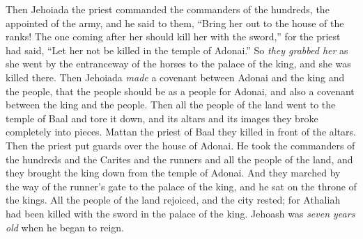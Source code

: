 \begin{biblechapter}
\verse Then Jehoiada the priest commanded the commanders of the hundreds, the appointed of the army, and he said to them, “Bring her out to the house of the ranks! The one coming after her should kill her with the sword,” for the priest had said, “Let her not be killed in the temple of Adonai.”
\verse So \textit{they grabbed her} as she went by the entranceway of the horses to the palace of the king, and she was killed there.
\verse Then Jehoiada \textit{made} a covenant between Adonai and the king and the people, that the people should be as a people for Adonai, and also a covenant between the king and the people.
\verse Then all the people of the land went to the temple of Baal and tore it down, and its altars and its images they broke completely into pieces. Mattan the priest of Baal they killed in front of the altars. Then the priest put guards over the house of Adonai.
\verse He took the commanders of the hundreds and the Carites and the runners and all the people of the land, and they brought the king down from the temple of Adonai. And they marched by the way of the runner’s gate to the palace of the king, and he sat on the throne of the kings.
\verse All the people of the land rejoiced, and the city rested; for Athaliah had been killed with the sword in the palace of the king.
\verse  Jehoash was \textit{seven years old} when he began to reign.
\end{biblechapter}

